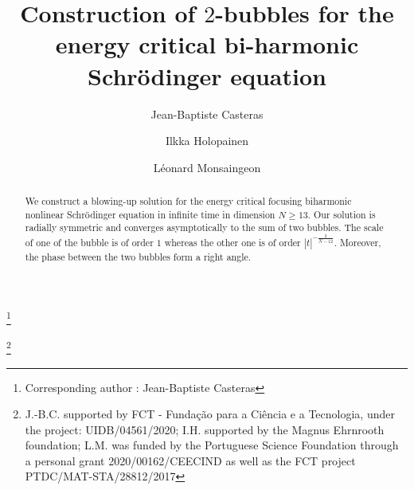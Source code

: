 \documentclass[a4paper,two-side,10pt]{amsart}
\newtheorem{thm}{Theorem}[section]
\numberwithin{equation}{section}
\begin{document}


\title[4NLS]{Construction of $2$-bubbles for the energy critical bi-harmonic Schr\" odinger equation}
\author[Jean-Baptiste Casteras]{Jean-Baptiste Casteras} \thanks{Corresponding author : Jean-Baptiste Casteras}
\address{CMAFCIO, Faculdade de Ci\^encias da Universidade de Lisboa, Edificio C6, Piso 1, Campo Grande 1749-016 Lisboa, Portugal}

\author[Ilkka Holopainen]{Ilkka Holopainen}
\address{Department of Mathematics and Statistics, P.O. Box 68, 00014 University of
Helsinki, Finland}
\author[L\' eonard Monsaingeon]{L\' eonard Monsaingeon}
\address{GFM, Faculdade de Ci\^encias da Universidade de Lisboa, Edificio C6, Piso 1, Campo Grande 1749-016 Lisboa, Portugal and  IECL Universit\' e de Lorraine, F-54506, Vandoeuvre-l\`es-Nancy Cedex, France.}
\thanks{J.-B.C. supported by FCT - Funda\c c\~ao para a Ci\^encia e a Tecnologia, under the project: UIDB/04561/2020; I.H. supported by the Magnus Ehrnrooth foundation;  L.M. was funded by the Portuguese Science Foundation through a personal grant 2020/00162/CEECIND as well as the FCT project PTDC/MAT-STA/28812/2017}


\begin{abstract}
We construct a blowing-up solution for the energy critical focusing biharmonic nonlinear Schr\"odinger equation in infinite time in dimension $N\geq 13$. Our solution is radially symmetric and converges asymptotically to the sum of two bubbles. The scale of one of the bubble is of order $1$ whereas the other one is of order $|t|^{-\frac{2}{N-12}}$. Moreover, the phase between the two bubbles form a right angle.
\end{abstract}

\maketitle
\end{document}
